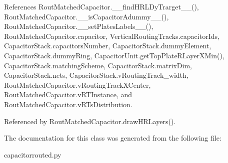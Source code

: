 References Rout\+Matched\+Capacitor.\+\_\+\+\_\+find\+H\+R\+L\+Dy\+Trarget\+\_\+\+\_\+(), Rout\+Matched\+Capacitor.\+\_\+\+\_\+is\+Capacitor\+Adummy\+\_\+\+\_\+(), Rout\+Matched\+Capacitor.\+\_\+\+\_\+set\+Plates\+Labels\+\_\+\+\_\+(), Rout\+Matched\+Capacitor.\+capacitor, Vertical\+Routing\+Tracks.\+capacitor\+Ids, Capacitor\+Stack.\+capacitors\+Number, Capacitor\+Stack.\+dummy\+Element, Capacitor\+Stack.\+dummy\+Ring, Capacitor\+Unit.\+get\+Top\+Plate\+R\+Layer\+X\+Min(), Capacitor\+Stack.\+matching\+Scheme, Capacitor\+Stack.\+matrix\+Dim, Capacitor\+Stack.\+nets, Capacitor\+Stack.\+v\+Routing\+Track\+\_\+width, Rout\+Matched\+Capacitor.\+v\+Routing\+Track\+X\+Center, Rout\+Matched\+Capacitor.\+v\+R\+T\+Instance, and Rout\+Matched\+Capacitor.\+v\+R\+Ts\+Distribution.



Referenced by Rout\+Matched\+Capacitor.\+draw\+H\+R\+Layers().



The documentation for this class was generated from the following file\+:\begin{DoxyCompactItemize}
\item 
capacitorrouted.\+py\end{DoxyCompactItemize}
